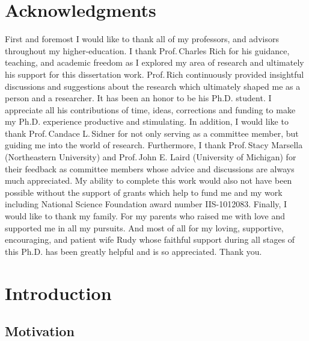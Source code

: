 \documentclass[12pt]{report}
\begin{document}
\chapter*{Acknowledgments}
First and foremost I would like to thank all of my professors, and advisors
throughout my higher-education. I thank Prof.\,Charles Rich for his guidance,
teaching, and academic freedom as I explored my area of research and ultimately
his support for this dissertation work. Prof.\,Rich continuously provided
insightful discussions and suggestions about the research which ultimately
shaped me as a person and a researcher. It has been an honor to be his Ph.D.
student. I appreciate all his contributions of time, ideas, corrections and
funding to make my Ph.D. experience productive and stimulating. In addition, I
would like to thank Prof.\,Candace L.\,Sidner for not only serving as a
committee member, but guiding me into the world of research. Furthermore, I
thank Prof.\,Stacy Marsella (Northeastern University) and Prof.\,John E. Laird
(University of Michigan) for their feedback as committee members whose advice
and discussions are always much appreciated. My ability to complete this work
would also not have been possible without the support of grants which help to
fund me and my work including National Science Foundation award number
IIS-1012083. Finally, I would like to thank my family. For my parents who raised
me with love and supported me in all my pursuits. And most of all for my loving,
supportive, encouraging, and patient wife Rudy whose faithful support during all
stages of this Ph.D. has been greatly helpful and is so appreciated. Thank you.

\pagebreak

\tableofcontents
\pagebreak

\listoffigures
\pagebreak

\listoftables
\pagebreak

\listofalgorithms
{}
\pagebreak


\chapter{Introduction}
\label{ch:introduction}

\section{Motivation}
\end{document}
